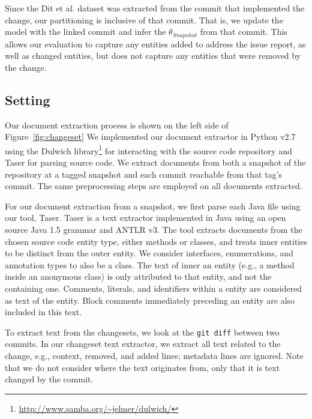 Since the Dit et al. dataset was extracted from the commit that implemented the change,
our partitioning is inclusive of that commit.
That is, we update the model with the linked commit and infer the
$\theta_{Snapshot}$ from that commit.
This allows our evaluation to capture any entities added to address the issue report,
as well as changed entities,
but does not capture any entities that were removed by the change.




\subsection{Setting}

Our document extraction process is shown on the left side of Figure~\ref{fig:changeset}
We implemented our document extractor in Python v2.7
using the Dulwich library\footnote{\url{http://www.samba.org/~jelmer/dulwich/}}
for interacting with the source code repository and
Taser for parsing source code.
We extract documents from both a snapshot of the repository at a tagged
snapshot and each commit reachable from that tag's commit.
The same preprocessing steps are employed on all documents extracted.

For our document extraction from a snapshot, we first parse each Java file using our tool, Taser.
Taser is a text extractor implemented in Java using an open source Java 1.5 grammar and ANTLR v3.
The tool extracts documents from the chosen source code entity type,
either methods or classes, and treats inner entities to be distinct from the outer entity.
We consider interfaces, enumerations, and annotation types to also be a class.
The text of inner an entity (e.g., a method inside an anonymous class)
is only attributed to that entity, and not the containing one.
Comments, literals, and identifiers within a entity are considered as text of the entity.
Block comments immediately preceding an entity are also included in this text.

To extract text from the changesets, we look at
the \texttt{git diff} between two commits.
In our changeset text extractor, we extract all text related to the
change, e.g., context, removed, and added lines; metadata lines are ignored.
Note that we do not consider where the text originates from,
only that it is text changed by the commit.%

